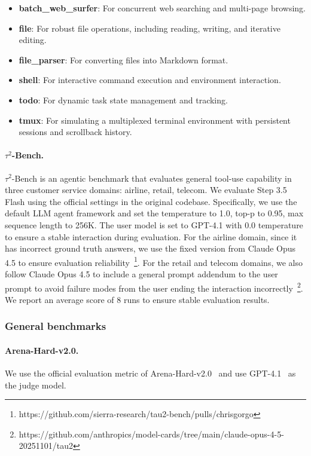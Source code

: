 \begin{itemize}
    \item \textbf{batch\_web\_surfer}: For concurrent web searching and multi-page browsing.
    \item \textbf{file}: For robust file operations, including reading, writing, and iterative editing.
    \item \textbf{file\_parser}: For converting files into Markdown format.
    \item \textbf{shell}: For interactive command execution and environment interaction.
    \item \textbf{todo}: For dynamic task state management and tracking.
    \item \textbf{tmux}: For simulating a multiplexed terminal environment with persistent sessions and scrollback history.
\end{itemize}

\paragraph{$\tau^2$-Bench.}

$\tau^2$-Bench\cite{tau2bench2025} is an agentic benchmark that evaluates general tool-use capability in three customer service domains: airline, retail, telecom. We evaluate Step 3.5 Flash using the official settings in the original codebase. Specifically, we use the default LLM agent framework and set the temperature to 1.0, top-p to 0.95, max sequence length to 256K. The user model is set to GPT-4.1 with 0.0 temperature to ensure a stable interaction during evaluation. For the airline domain, since it has incorrect ground truth answers, we use the fixed version from Claude Opus 4.5 to ensure evaluation reliability~\footnote{https://github.com/sierra-research/tau2-bench/pulls/chrisgorgo}. For the retail and telecom domains, we also follow Claude Opus 4.5 to include a general prompt addendum to the user prompt to avoid failure modes from the user ending the interaction incorrectly~\footnote{https://github.com/anthropics/model-cards/tree/main/claude-opus-4-5-20251101/tau2}. We report an average score of 8 runs to ensure stable evaluation results.


\subsubsection{General benchmarks}

\paragraph{Arena-Hard-v2.0.} We use the official evaluation metric of Arena-Hard-v2.0~\cite{arenahard2024} and use GPT-4.1~\cite{openai2024gpt4technicalreport} as the judge model.

